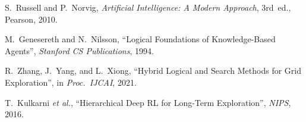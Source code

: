 \documentclass[12pt]{article}
\begin{document}

\begin{thebibliography}{9}
  S.~Russell and P.~Norvig,
  \emph{Artificial Intelligence: A Modern Approach},
  3rd~ed., Pearson, 2010.

  M.~Genesereth and N.~Nilsson,
  ``Logical Foundations of Knowledge-Based Agents'',
  \emph{Stanford CS Publications}, 1994.

  R.~Zhang, J.~Yang, and L.~Xiong,
  ``Hybrid Logical and Search Methods for Grid Exploration'',
  in \emph{Proc.\ IJCAI}, 2021.

  T.~Kulkarni \emph{et al.},
  ``Hierarchical Deep RL for Long-Term Exploration'',
  \emph{NIPS}, 2016.
\end{thebibliography}
\end{document}
